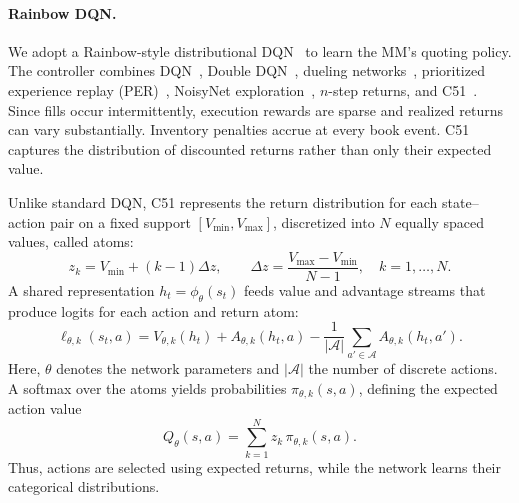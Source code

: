 \documentclass[11pt,a4paper]{article}
\begin{document}
\paragraph{Rainbow DQN.}
We adopt a Rainbow-style distributional DQN~\citep{hessel2018}
to learn the MM's quoting policy. The controller combines
DQN~\citep{mnih2015}, Double DQN~\citep{vanhasselt2016},
dueling networks~\citep{wang2016dueling}, prioritized
experience replay (PER)~\citep{schaul2016prioritized},
NoisyNet exploration~\citep{fortunato2018noisy},
$n$-step returns, and C51~\citep{bellemare2017}.
Since fills occur intermittently, execution rewards are
sparse and realized returns can vary substantially.
Inventory penalties accrue at every book event.
C51 captures the distribution of discounted returns
rather than only their expected value.

Unlike standard DQN, C51 represents the return distribution
for each state--action pair on a fixed support
$[V_{\min},V_{\max}]$, discretized into $N$ equally spaced
values, called atoms:
\begin{equation}
  z_k=V_{\min}+(k-1)\Delta z,
  \qquad
  \Delta z=\frac{V_{\max}-V_{\min}}{N-1},
  \quad k=1,\ldots,N.
\end{equation}
A shared representation $h_t=\phi_\theta(s_t)$ feeds
value and advantage streams that produce logits for each
action and return atom:
\begin{equation}
  \ell_{\theta,k}(s_t,a)
  =
  V_{\theta,k}(h_t)
  +
  A_{\theta,k}(h_t,a)
  -
  \frac{1}{|\mathcal A|}
  \sum_{a'\in\mathcal A} A_{\theta,k}(h_t,a').
\end{equation}
Here, $\theta$ denotes the network parameters and
$|\mathcal A|$ the number of discrete actions.
A softmax over the atoms yields probabilities
$\pi_{\theta,k}(s,a)$, defining the expected action value
\begin{equation}
  Q_\theta(s,a)
  =
  \sum_{k=1}^{N} z_k\,\pi_{\theta,k}(s,a).
\end{equation}
Thus, actions are selected using expected returns, while
the network learns their categorical distributions.
\end{document}
